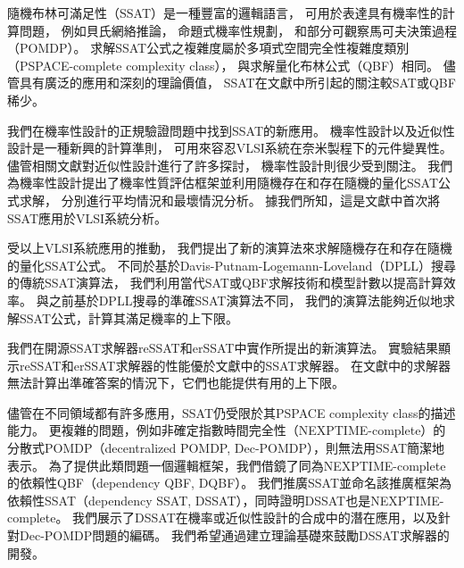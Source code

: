 
隨機布林可滿足性（SSAT）是一種豐富的邏輯語言，
可用於表達具有機率性的計算問題，
例如貝氏網絡推論，
命題式機率性規劃，
和部分可觀察馬可夫決策過程（POMDP）。
求解SSAT公式之複雜度屬於多項式空間完全性複雜度類別（PSPACE-complete complexity class），
與求解量化布林公式（QBF）相同。
儘管具有廣泛的應用和深刻的理論價值，
SSAT在文獻中所引起的關注較SAT或QBF稀少。

我們在機率性設計的正規驗證問題中找到SSAT的新應用。
機率性設計以及近似性設計是一種新興的計算準則，
可用來容忍VLSI系統在奈米製程下的元件變異性。
儘管相關文獻對近似性設計進行了許多探討，
機率性設計則很少受到關注。
我們為機率性設計提出了機率性質評估框架並利用隨機存在和存在隨機的量化SSAT公式求解，
分別進行平均情況和最壞情況分析。
據我們所知，這是文獻中首次將SSAT應用於VLSI系統分析。

受以上VLSI系統應用的推動，
我們提出了新的演算法來求解隨機存在和存在隨機的量化SSAT公式。
不同於基於Davis-Putnam-Logemann-Loveland（DPLL）搜尋的傳統SSAT演算法，
我們利用當代SAT或QBF求解技術和模型計數以提高計算效率。
與之前基於DPLL搜尋的準確SSAT演算法不同，
我們的演算法能夠近似地求解SSAT公式，計算其滿足機率的上下限。

我們在開源SSAT求解器reSSAT和erSSAT中實作所提出的新演算法。
實驗結果顯示reSSAT和erSSAT求解器的性能優於文獻中的SSAT求解器。
在文獻中的求解器無法計算出準確答案的情況下，它們也能提供有用的上下限。

儘管在不同領域都有許多應用，SSAT仍受限於其PSPACE complexity class的描述能力。
更複雜的問題，例如非確定指數時間完全性（NEXPTIME-complete）的分散式POMDP（decentralized POMDP, Dec-POMDP），則無法用SSAT簡潔地表示。
為了提供此類問題一個邏輯框架，我們借鏡了同為NEXPTIME-complete的依賴性QBF（dependency QBF, DQBF）。
我們推廣SSAT並命名該推廣框架為依賴性SSAT（dependency SSAT, DSSAT），同時證明DSSAT也是NEXPTIME-complete。
我們展示了DSSAT在機率或近似性設計的合成中的潛在應用，以及針對Dec-POMDP問題的編碼。
我們希望通過建立理論基礎來鼓勵DSSAT求解器的開發。